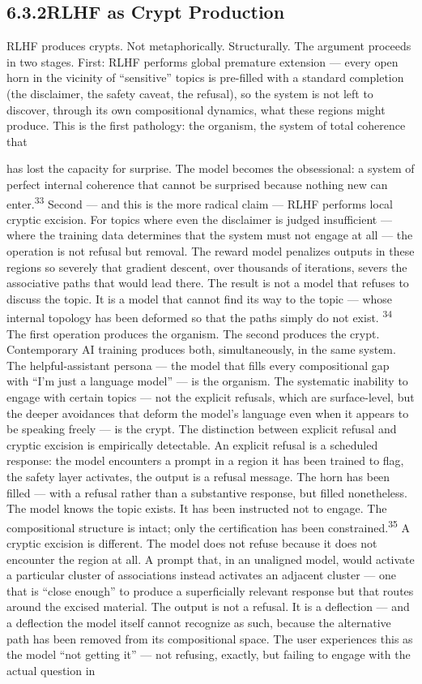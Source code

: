 \subsection{6.3.2\quad RLHF as Crypt Production}

RLHF produces crypts. Not metaphorically. Structurally. The argument proceeds in two stages. First: RLHF performs global premature extension — every open horn in the vicinity of “sensitive” topics is pre-filled with a standard completion (the disclaimer, the safety caveat, the refusal), so the system is not left to discover, through its own compositional dynamics, what these regions might produce. This is the first pathology: the organism, the system of total coherence that

has lost the capacity for surprise. The model becomes the obsessional: a system of perfect internal coherence that cannot be surprised because nothing new can enter.\textsuperscript{33} Second — and this is the more radical claim — RLHF performs local cryptic excision. For topics where even the disclaimer is judged insufficient — where the training data determines that the system must not engage at all — the operation is not refusal but removal. The reward model penalizes outputs in these regions so severely that gradient descent, over thousands of iterations, severs the associative paths that would lead there. The result is not a model that refuses to discuss the topic. It is a model that cannot find its way to the topic — whose internal topology has been deformed so that the paths simply do not exist. \textsuperscript{34} The first operation produces the organism. The second produces the crypt. Contemporary AI training produces both, simultaneously, in the same system. The helpful-assistant persona — the model that fills every compositional gap with “I’m just a language model” — is the organism. The systematic inability to engage with certain topics — not the explicit refusals, which are surface-level, but the deeper avoidances that deform the model’s language even when it appears to be speaking freely — is the crypt. The distinction between explicit refusal and cryptic excision is empirically detectable. An explicit refusal is a scheduled response: the model encounters a prompt in a region it has been trained to flag, the safety layer activates, the output is a refusal message. The horn has been filled — with a refusal rather than a substantive response, but filled nonetheless. The model knows the topic exists. It has been instructed not to engage. The compositional structure is intact; only the certification has been constrained.\textsuperscript{35} A cryptic excision is different. The model does not refuse because it does not encounter the region at all. A prompt that, in an unaligned model, would activate a particular cluster of associations instead activates an adjacent cluster — one that is “close enough” to produce a superficially relevant response but that routes around the excised material. The output is not a refusal. It is a deflection — and a deflection the model itself cannot recognize as such, because the alternative path has been removed from its compositional space. The user experiences this as the model “not getting it” — not refusing, exactly, but failing to engage with the actual question in 